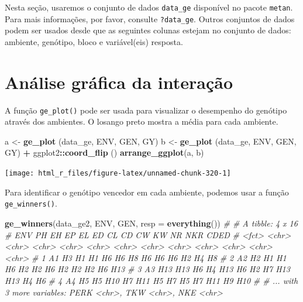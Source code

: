 \documentclass[
]{book}
\newenvironment{Shaded}{\begin{snugshade}}{\end{snugshade}}
\newcommand{\CommentTok}[1]{\textcolor[rgb]{0.56,0.35,0.01}{\textit{#1}}}
\newcommand{\DataTypeTok}[1]{\textcolor[rgb]{0.13,0.29,0.53}{#1}}
\newcommand{\KeywordTok}[1]{\textcolor[rgb]{0.13,0.29,0.53}{\textbf{#1}}}
\newcommand{\NormalTok}[1]{#1}
\newcommand{\OperatorTok}[1]{\textcolor[rgb]{0.81,0.36,0.00}{\textbf{#1}}}
\newcommand{\StringTok}[1]{\textcolor[rgb]{0.31,0.60,0.02}{#1}}
\begin{document}
Nesta seção, usaremos o conjunto de dados \texttt{data\_ge} disponível no pacote \texttt{metan}. Para mais informações, por favor, consulte \texttt{?data\_ge}. Outros conjuntos de dados podem ser usados desde que as seguintes colunas estejam no conjunto de dados: ambiente, genótipo, bloco e variável(eis) resposta.

\hypertarget{anuxe1lise-gruxe1fica-da-interauxe7uxe3o}{%
\section{Análise gráfica da interação}\label{anuxe1lise-gruxe1fica-da-interauxe7uxe3o}}

A função \texttt{ge\_plot()} pode ser usada para visualizar o desempenho do genótipo através dos ambientes. O losango preto mostra a média para cada ambiente.

\begin{Shaded}
\begin{Highlighting}[]
\NormalTok{a <-}\StringTok{ }\KeywordTok{ge_plot}\NormalTok{ (data_ge, ENV, GEN, GY)}
\NormalTok{b <-}\StringTok{ }\KeywordTok{ge_plot}\NormalTok{ (data_ge, ENV, GEN, GY) }\OperatorTok{+}\StringTok{ }\NormalTok{ggplot2}\OperatorTok{::}\KeywordTok{coord_flip}\NormalTok{ ()}
\KeywordTok{arrange_ggplot}\NormalTok{(a, b)}
\end{Highlighting}
\end{Shaded}

\begin{center}\texttt{[image: html\_r\_files/figure-latex/unnamed-chunk-320-1]} \end{center}

Para identificar o genótipo vencedor em cada ambiente, podemos usar a função \texttt{ge\_winners()}.

\begin{Shaded}
\begin{Highlighting}[]
\KeywordTok{ge_winners}\NormalTok{(data_ge2, ENV, GEN, }\DataTypeTok{resp =} \KeywordTok{everything}\NormalTok{())}
\CommentTok{# # A tibble: 4 x 16}
\CommentTok{#   ENV   PH    EH    EP    EL    ED    CL    CD    CW    KW    NR    NKR   CDED }
\CommentTok{#   <fct> <chr> <chr> <chr> <chr> <chr> <chr> <chr> <chr> <chr> <chr> <chr> <chr>}
\CommentTok{# 1 A1    H3    H1    H1    H6    H6    H8    H6    H6    H6    H2    H4    H8   }
\CommentTok{# 2 A2    H2    H1    H1    H6    H2    H2    H6    H2    H2    H2    H6    H13  }
\CommentTok{# 3 A3    H13   H13   H6    H4    H13   H6    H2    H7    H13   H13   H4    H6   }
\CommentTok{# 4 A4    H5    H5    H10   H7    H11   H5    H7    H5    H7    H11   H9    H10  }
\CommentTok{# # ... with 3 more variables: PERK <chr>, TKW <chr>, NKE <chr>}
\end{Highlighting}
\end{Shaded}
\end{document}
